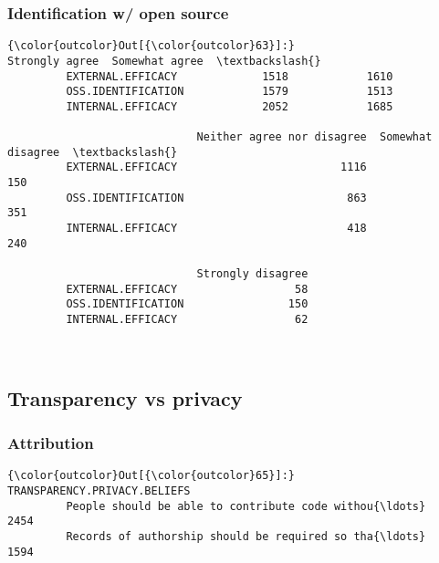 \documentclass[11pt]{article}
\begin{document}
    \subsubsection{Identification w/ open
source}\label{identification-w-open-source}



            \begin{Verbatim}[commandchars=\\\{\}]
{\color{outcolor}Out[{\color{outcolor}63}]:}                     Strongly agree  Somewhat agree  \textbackslash{}
         EXTERNAL.EFFICACY             1518            1610   
         OSS.IDENTIFICATION            1579            1513   
         INTERNAL.EFFICACY             2052            1685   
         
                             Neither agree nor disagree  Somewhat disagree  \textbackslash{}
         EXTERNAL.EFFICACY                         1116                150   
         OSS.IDENTIFICATION                         863                351   
         INTERNAL.EFFICACY                          418                240   
         
                             Strongly disagree  
         EXTERNAL.EFFICACY                  58  
         OSS.IDENTIFICATION                150  
         INTERNAL.EFFICACY                  62  
\end{Verbatim}
        

    \begin{center}
    \end{center}
    { \hspace*{\fill} \\}
    
    \subsection{Transparency vs privacy}\label{transparency-vs-privacy}

    \subsubsection{Attribution}\label{attribution}


            \begin{Verbatim}[commandchars=\\\{\}]
{\color{outcolor}Out[{\color{outcolor}65}]:}                                                     TRANSPARENCY.PRIVACY.BELIEFS
         People should be able to contribute code withou{\ldots}                          2454
         Records of authorship should be required so tha{\ldots}                          1594
\end{Verbatim}
        
\end{document}
